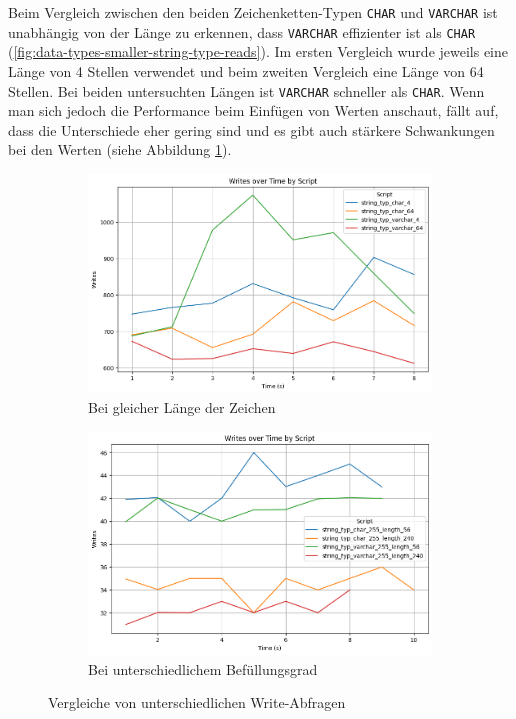 Beim Vergleich zwischen den beiden Zeichenketten-Typen \texttt{CHAR} und \texttt{VARCHAR} ist unabhängig von der Länge zu erkennen, dass \texttt{VARCHAR} effizienter ist als \texttt{CHAR} (\ref{fig:data-types-smaller-string-type-reads}).
Im ersten Vergleich wurde jeweils eine Länge von 4 Stellen verwendet und beim zweiten Vergleich eine Länge von 64 Stellen.
Bei beiden untersuchten Längen ist \texttt{VARCHAR} schneller als \texttt{CHAR}.
Wenn man sich jedoch die Performance beim Einfügen von Werten anschaut, fällt auf, dass die Unterschiede eher gering sind und es gibt auch stärkere Schwankungen bei den Werten (siehe Abbildung \ref{fig:data-types-smaller-string-type-writes}).

\vspace{-12pt}
\begin{figure}[H]
    \centering
    \begin{subfigure}[t]{0.48\textwidth}
        \centering
        \includegraphics[width=\textwidth]{PNGs/Script/Data_Types/Smaller/string-type/Writes}
        \caption{Bei gleicher Länge der Zeichen}
        \label{fig:data-types-smaller-string-type-writes}
    \end{subfigure}
    \hfill
    \begin{subfigure}[t]{0.48\textwidth}
        \centering
        \includegraphics[width=\textwidth]{PNGs/Script/Data_Types/Smaller/string-type-length/Writes}
        \caption{Bei unterschiedlichem Befüllungsgrad}
        \label{fig:data-types-smaller-string-type-length-writes}
    \end{subfigure}
    \caption{Vergleiche von unterschiedlichen Write-Abfragen}
\end{figure}
